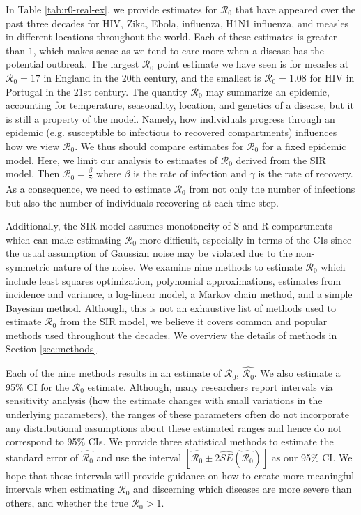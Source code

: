 \documentclass[12pt]{article}
\newcommand{\wxxsir}{nine } %
\newcommand{\rr}{\ensuremath{\mathcal{R}_0}}
\begin{document}
In Table \ref{tab:r0-real-ex}, we provide estimates for $\rr$ that have appeared over the past three decades for HIV, Zika, Ebola, influenza, H1N1 influenza, and measles in different locations throughout the world.  Each of these estimates is greater than $1$, which makes sense as we tend to care more when a disease has the potential outbreak.  The largest $\rr$ point estimate we have seen is for measles at $\rr=17$ in England in the 20th century, and the smallest is $\rr=1.08$ for HIV in Portugal in the 21st century.
The quantity $\rr$ may summarize an epidemic, accounting for temperature, seasonality, location, and genetics of a disease, but it is still a property of the model.  Namely, how individuals progress through an epidemic (e.g. susceptible to infectious to recovered compartments) influences how we view $\rr$.  We thus should compare estimates for $\rr$ for a fixed epidemic model.  Here, we limit our analysis to estimates of $\rr$ derived from the SIR model.  Then $\rr = \frac{\beta}{\gamma}$ where $\beta$ is the rate of infection and $\gamma$ is the rate of recovery.  As a consequence, we need to estimate $\rr$ from not only the number of infections but also the number of individuals recovering at each time step.


Additionally, the SIR model assumes monotoncity of S and R compartments which can make estimating $\rr$ more difficult, especially in terms of the CIs since the usual assumption of Gaussian noise may be violated due to the non-symmetric nature of the noise.  We examine \wxxsir methods to estimate $\rr$ which include least squares optimization, polynomial approximations, estimates from incidence and variance, a log-linear model, a Markov chain method, and a simple Bayesian method.  Although, this is not an exhaustive list of methods used to estimate $\rr$ from the SIR model, we believe it covers common and popular methods used throughout the decades.  We overview the details of methods in Section \ref{sec:methods}.

Each of the \wxxsir methods results in an estimate of $\rr$, $\hat{\rr}$.  We also estimate a 95\% CI for the  $\rr$ estimate.  Although, many researchers report intervals via sensitivity analysis (how the estimate changes with small variations in the underlying parameters), the ranges of these parameters often do not incorporate any distributional assumptions about these estimated ranges and hence do not correspond to 95\% CIs.  We provide three statistical methods to estimate the standard error of $\hat{\rr}$ and use the interval $\left [\hat{\rr} \pm 2\hat{SE}\left (\hat{\rr} \right ) \right ]$ as our 95\% CI.  We hope that these intervals will provide guidance on how to create more meaningful intervals when estimating $\rr$ and discerning which diseases are more severe than others, and whether the true $\rr >1$.
\end{document}
